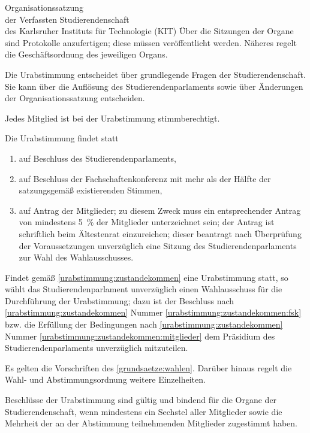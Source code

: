 \begin{jurdoc}[Organisationssatzung]{Organisationssatzung\\der Verfassten Studierendenschaft\\des Karlsruher Instituts für Technologie (KIT)}
Über die Sitzungen der Organe sind Protokolle anzufertigen; diese müssen veröffentlicht werden. Näheres regelt die Geschäftsordnung des jeweiligen Organs.

%
%


Die Urabstimmung entscheidet über grundlegende Fragen der Studierendenschaft. Sie kann über die Auflösung des Studierendenparlaments sowie über Änderungen der Organisationssatzung entscheiden.

Jedes Mitglied ist bei der Urabstimmung stimmberechtigt.

\label{urabstimmung:zustandekommen}
Die Urabstimmung findet statt
\begin{enumerate}
\item auf Beschluss des Studierendenparlaments,
\item auf Beschluss der Fachschaftenkonferenz mit mehr als der Hälfte der satzungsgemäß existierenden Stimmen, \label{urabstimmung:zustandekommen:fsk}
\item auf Antrag der Mitglieder; zu diesem Zweck muss ein entsprechender Antrag von mindestens 5~\% der Mitglieder unterzeichnet sein; der Antrag ist schriftlich beim Ältestenrat einzureichen; dieser beantragt nach Überprüfung der Voraussetzungen unverzüglich eine Sitzung des Studierendenparlaments zur Wahl des Wahlausschusses. \label{urabstimmung:zustandekommen:mitglieder}
\end{enumerate}

\label{urabstimmung:orga}

Findet gemäß \ref{urabstimmung:zustandekommen} eine Urabstimmung statt, so wählt das Studierendenparlament unverzüglich einen Wahlausschuss für die Durchführung der Urabstimmung; dazu ist der Beschluss nach \ref{urabstimmung:zustandekommen} Nummer \ref{urabstimmung:zustandekommen:fsk} bzw. die Erfüllung  der Bedingungen nach \ref{urabstimmung:zustandekommen}  Nummer \ref{urabstimmung:zustandekommen:mitglieder} dem Präsidium des Studierendenparlaments unverzüglich mitzuteilen.

Es gelten die Vorschriften des \ref{grundsaetze:wahlen}. Darüber hinaus regelt die Wahl- und Abstimmungsordnung weitere Einzelheiten.



Beschlüsse der Urabstimmung sind gültig und bindend für die Organe der Studierendenschaft, wenn mindestens ein Sechstel aller Mitglieder sowie die Mehrheit der an der Abstimmung teilnehmenden Mitglieder zugestimmt haben.


\end{jurdoc}
